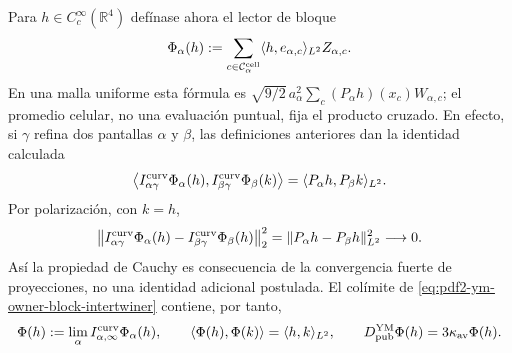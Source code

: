 Para $h\in C_c^\infty(\mathbb R^4)$ defínase ahora el lector de bloque
\begin{equation}\label{eq:pdf2-ym-owner-smeared-witness}
 \Phi_\alpha(h):=
 \sum_{c\in\mathcal C_\alpha^{\rm cell}}
 \langle h,e_{\alpha,c}\rangle_{L^2}Z_{\alpha,c}.
\end{equation}
En una malla uniforme esta fórmula es
$\sqrt{9/2}\,a_\alpha^2\sum_c(P_\alpha h)(x_c)W_{\alpha,c}$; el promedio celular,
no una evaluación puntual, fija el producto cruzado. En efecto, si $\gamma$ refina
dos pantallas $\alpha$ y $\beta$, las definiciones anteriores dan la identidad
calculada
\begin{equation}\label{eq:pdf2-ym-owner-smeared-cross-gram}
 \left\langle
  I_{\alpha\gamma}^{\rm curv}\Phi_\alpha(h),
  I_{\beta\gamma}^{\rm curv}\Phi_\beta(k)
 \right\rangle
 =\langle P_\alpha h,P_\beta k\rangle_{L^2}.
\end{equation}
Por polarización, con $k=h$,
\begin{equation}\label{eq:pdf2-ym-owner-smeared-cauchy-derived}
 \left\|
  I_{\alpha\gamma}^{\rm curv}\Phi_\alpha(h)
  -I_{\beta\gamma}^{\rm curv}\Phi_\beta(h)
 \right\|_2^2
 =\|P_\alpha h-P_\beta h\|_{L^2}^2\longrightarrow0.
\end{equation}
Así la propiedad de Cauchy es consecuencia de la convergencia fuerte de
proyecciones, no una identidad adicional postulada. El colímite de
\eqref{eq:pdf2-ym-owner-block-intertwiner} contiene, por tanto,
\begin{equation}\label{eq:pdf2-ym-owner-smeared-gram}
 \Phi(h):=\lim_\alpha I_{\alpha,\infty}^{\rm curv}\Phi_\alpha(h),
 \qquad
 \langle\Phi(h),\Phi(k)\rangle=\langle h,k\rangle_{L^2},
 \qquad
 D_{\rm pub}^{\rm YM}\Phi(h)=3\kappa_{\rm av}\Phi(h).
\end{equation}


